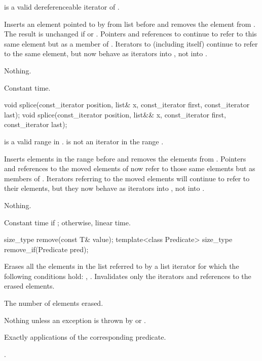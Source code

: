 \begin{itemdescr}
\pnum
\expects
{} is a valid dereferenceable iterator of .

\pnum
\effects
Inserts an element pointed to by
from list
before  and removes the element from
.
The result is unchanged if
or
.
Pointers and references to
continue to refer to this same element but as a member of
.
Iterators
to
(including
itself) continue to refer to the same element, but now behave as iterators into
,
not into
.

\pnum
\throws
Nothing.

\pnum
\complexity
Constant time.
\end{itemdescr}

%
\begin{itemdecl}
void splice(const_iterator position, list& x, const_iterator first,
            const_iterator last);
void splice(const_iterator position, list&& x, const_iterator first,
            const_iterator last);
\end{itemdecl}

\begin{itemdescr}
\pnum
\expects
\tcode{[first, last)} is a valid range in .
 is not an iterator in the range .

\pnum
\effects
Inserts elements in the range
before
and removes the elements from
.
Pointers and references to the moved elements of
now refer to those same elements but as members of
.
Iterators referring to the moved elements will continue to refer to their
elements, but they now behave as iterators into
,
not into
.

\pnum
\throws
Nothing.

\pnum
\complexity
Constant time if
;
otherwise, linear time.
\end{itemdescr}

%
\begin{itemdecl}
size_type remove(const T& value);
template<class Predicate> size_type remove_if(Predicate pred);
\end{itemdecl}

\begin{itemdescr}
\pnum
\effects
Erases all the elements in the list referred to by a list iterator  for which the
following conditions hold: , .
Invalidates only the iterators and references to the erased elements.

\pnum
\returns
The number of elements erased.

\pnum
\throws
Nothing unless an exception is thrown by
or
.

\pnum
\complexity
Exactly
applications of the corresponding predicate.

\pnum
\remarks
{}.
\end{itemdescr}

